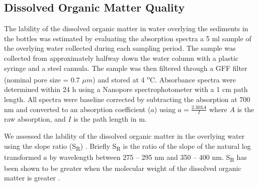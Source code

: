 \subsection{Dissolved Organic Matter Quality}

The lability of the dissolved organic matter in water overlying the sediments in the bottles was estimated by evaluating the absorption spectra a 5 ml sample of the overlying water collected during each sampling period. The sample was collected from approximately halfway down the water column with a plastic syringe and a steel cannula. The sample was then filtered through a GFF filter (nominal pore size = 0.7 $\mu m$) and stored at 4 \textsuperscript{o}C. Absorbance spectra were determined within 24 h using a Nanopore spectrophotometer with a 1 cm path length. All spectra were baseline corrected by subtracting the absorption at 700 nm and converted to an absorption coefficient ($a$) using $a = \frac{2.303A}{I}$ where $A$ is the raw absorption, and $I$ is the path length in m.

We assessed the lability of the dissolved organic matter in the overlying water using the slope ratio (S\textsubscript{R}) \cite{helmsetal2008}. Briefly S\textsubscript{R} is the ratio of the slope of the natural log transformed $a$ by wavelength between 275 -- 295 nm and 350 -- 400 nm. S\textsubscript{R} has been shown to be greater when the molecular weight of the dissolved organic matter is greater \cite{helmsetal2008}. 

  
  